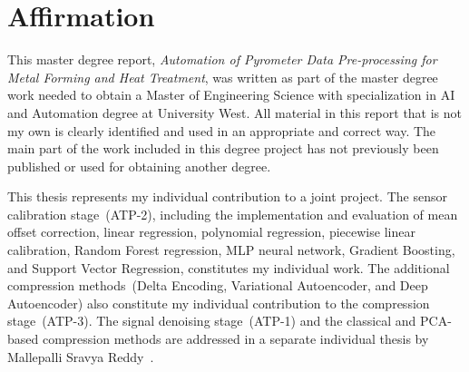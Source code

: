 \section*{Affirmation}
\vspace{-2ex}\titlerule\vspace{4ex}

This master degree report, \textit{Automation of Pyrometer Data Pre-processing for Metal Forming and Heat Treatment}, was written as part of the master degree work needed to obtain a Master of Engineering Science with specialization in AI and Automation degree at University West. All material in this report that is not my own is clearly identified and used in an appropriate and correct way. The main part of the work included in this degree project has not previously been published or used for obtaining another degree.

This thesis represents my individual contribution to a joint project. The sensor calibration stage~(ATP-2), including the implementation and evaluation of mean offset correction, linear regression, polynomial regression, piecewise linear calibration, Random Forest regression, MLP neural network, Gradient Boosting, and Support Vector Regression, constitutes my individual work. The additional compression methods~(Delta Encoding, Variational Autoencoder, and Deep Autoencoder) also constitute my individual contribution to the compression stage~(ATP-3). The signal denoising stage~(ATP-1) and the classical and PCA-based compression methods are addressed in a separate individual thesis by Mallepalli Sravya Reddy~\cite{sravya2026}.

\vspace{1.5cm}

\newcommand*{\SignatureAndDate}[1]{%
    \par\noindent\makebox[2.5in]{\hrulefill} \hfill\makebox[2.0in]{\hrulefill}%
    \par\noindent\makebox[2.5in][l]{#1}      \hfill{}%
}%
\SignatureAndDate{Avula Ajay Kumar}
